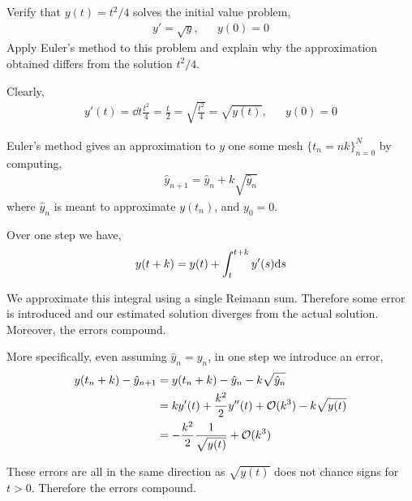 \documentclass[10pt]{article}
\begin{document}
\begin{problem}
Verify that \( y(t) = t^2/4 \) solves the initial value problem,
\begin{align*}
    y' = \sqrt{y}, && y(0) = 0
\end{align*}
Apply Euler’s method to this problem and explain why the approximation obtained differs
from the solution \( t^2/4 \).
\end{problem}

\begin{solution}[Solution]
Clearly,
\begin{align*}
    y'(t) = \dd{}{t} \frac{t^2}{4} = \frac{t}{2} = \sqrt{\frac{t^2}{4}} = \sqrt{y(t)}, && y(0) = 0
\end{align*}

Euler's method gives an approximation to \( y \) one some mesh \( \{ t_n = n k \}_{n=0}^{N}  \) by computing,
\begin{align*}
    \hat{y}_{n+1} = \hat{y}_n + k \sqrt{\hat{y}_n}
\end{align*}
where \( \hat{y}_n  \) is meant to approximate \( y(t_n) \), and \( y_0 = 0 \).

Over one step we have,
\begin{align*}
    y(t+k) = y(t) + \int_t^{t+k} y'(s)\mathrm{d} s
\end{align*}

We approximate this integral using a single Reimann sum. Therefore some error is introduced and our estimated solution diverges from the actual solution. Moreover, the errors compound.

    More specifically, even assuming \( \hat{y}_n = y_n \), in one step we introduce an error,
\begin{align*}
    y(t_n+k) - \hat{y}_{n+1} &=  y(t_n+k) - \hat{y}_n - k\sqrt{\hat{y}_n} 
    \\&= k y'(t) + \frac{k^2}{2}y''(t) + \mathcal{O}(k^3) - k\sqrt{y(t)} 
    \\&= -\frac{k^2}{2} \frac{1}{\sqrt{y(t)}} + \mathcal{O}(k^3)
\end{align*}

    These errors are all in the same direction as \( \sqrt{y(t)} \) does not chance signs for \( t>0 \). Therefore the errors compound.

\end{solution}
\end{document}
